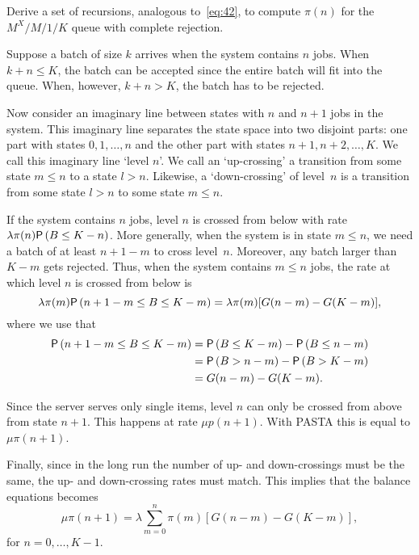 \begin{exercise}
 Derive a set of recursions, analogous to~\cref{eq:42}, to compute $\pi(n)$ for the $M^X/M/1/K$ queue with complete rejection.
\begin{solution}
 Suppose a batch of size $k$ arrives when the system contains $n$ jobs.
 When $k+n \leq K$, the batch can be accepted since the entire batch will fit into the queue.
 When, however, $k+n> K$, the batch has to be rejected.

 Now consider an imaginary line between states with $n$ and $n+1$ jobs in the system.
 This imaginary line separates the state space into two disjoint parts: one part with states $0, 1, \ldots, n$ and the other part with states $n+1, n+2, \ldots, K$.
 We call this imaginary line `level $n$'.
 We call an `up-crossing' a transition from some state $m\leq n$ to a state $l> n$.
 Likewise, a `down-crossing' of level~$n$ is a transition from some state $l> n$ to some state $m\leq n$.

 If the system contains $n$ jobs, level $n$ is crossed from below with rate $\lambda \pi(n) \P{B \leq K-n}$.
 More generally, when the system is in state $m\leq n$, we need a batch of at least $n+1-m$ to cross level~$n$.
 Moreover, any batch larger than $K-m$ gets rejected.
 Thus, when the system contains $m \leq n $ jobs, the rate at which level $n$ is crossed from below is
 \begin{equation*}
 \lambda \pi(m) \P{n+1-m\leq B \leq K-m} = \lambda \pi(m)
 [G(n-m)-G(K-m)],
 \end{equation*}
where we use that
\begin{align*}
\P{n+1-m\leq B \leq K-m} 
&= \P{B \leq K-m} - \P{B \leq n-m} \\
&= \P{B > n-m} - \P{B > K-m} \\
&= G(n-m)-G(K-m).
\end{align*}

 Since the server serves only single items, level $n$ can only be
 crossed from above from state $n+1$. This happens at rate $\mu p(n+1)$. With PASTA this is equal to $\mu \pi(n+1)$.

 Finally, since in the long run the number of up- and down-crossings must
 be the same, the up- and down-crossing rates must match. This implies
 that the balance equations becomes
 \begin{equation*}
 \mu \pi(n+1) = \lambda \sum_{m=0}^n \pi(m) [G(n-m)-G(K-m)],
 \end{equation*}
 for $n=0,\ldots, K-1$. 


\end{solution}
\end{exercise}

